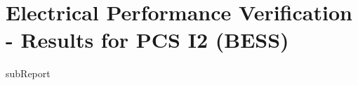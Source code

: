 \renewcommand{\DTRPcs}{I2PPM} %
\renewcommand{\DTRPcsLong}{I2 (BESS)}


    \section{Electrical Performance Verification - Results for PCS \DTRPcsLong}

    {{subReport}}
    \newpage


